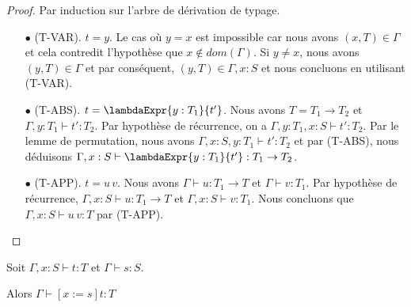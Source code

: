 \begin{proof}
  \label{proof:simply-typed-lambda-calculus-weakening}
  Par induction sur l'arbre de dérivation de typage.
  \begin{itemize}
  \item[$\bullet$] (T-VAR). $t = y$. Le cas où $y = x$ est impossible car nous avons $(x, T)
    \in \Gamma$ et cela contredit l'hypothèse que $x \notin dom(\Gamma)$. Si $y \neq
    x$, nous avons $(y, T) \in \Gamma$ et par conséquent, $(y, T) \in \Gamma, x : S$ et nous
    concluons en utilisant (T-VAR).
  \item[$\bullet$] (T-ABS). $t = \lambdaExpr{y : T_{1}}{t'}$. Nous avons $T = T_{1}
    \rightarrow T_{2}$ et $\Gamma, y : T_{1} \vdash t' : T_{2}$. Par hypothèse de
    récurrence, on a $\Gamma, y :
    T_{1}, x : S \vdash t' : T_{2}$. Par le lemme de permutation, nous avons
    $\Gamma, x : S, y : T_{1} \vdash t' : T_{2}$ et par (T-ABS), nous déduisons
    $\Gamma, x : S \vdash \lambdaExpr{y : T_{1}}{t'} : T_{1} \rightarrow T_{2}$.
    \item[$\bullet$] (T-APP). $t = u \, v$. Nous avons $\Gamma \vdash u : T_{1} \rightarrow
      T$ et $\Gamma \vdash v : T_{1}$. Par hypothèse de récurrence, $\Gamma, x : S
      \vdash u : T_{1} \rightarrow T$ et $\Gamma, x : S \vdash v : T_{1}$. Nous
      concluons que $\Gamma, x : S \vdash u \, v : T$ par (T-APP).
  \end{itemize}
\end{proof}

\begin{lemma} 
  \label{thm:simply-typed-lambda-calculus-preservation-substitution}
  Soit $\Gamma, x : S \vdash t : T$ et $\Gamma \vdash s : S$.

  Alors $\Gamma \vdash [x := s] t : T$
\end{lemma}

